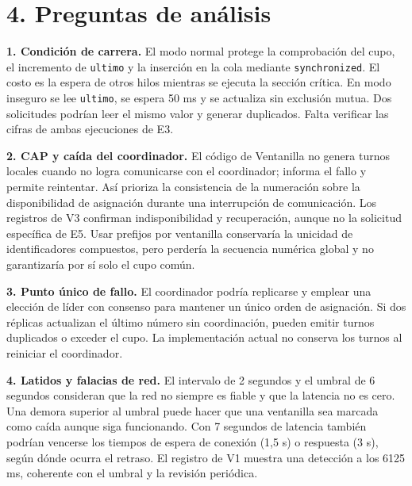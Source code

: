 \documentclass[11pt,a4paper]{article}
\begin{document}
\section*{4. Preguntas de análisis}
\textbf{1. Condición de carrera.} El modo normal protege la comprobación del cupo, el incremento de \texttt{ultimo} y la inserción en la cola mediante \texttt{synchronized}. El costo es la espera de otros hilos mientras se ejecuta la sección crítica. En modo inseguro se lee \texttt{ultimo}, se espera 50 ms y se actualiza sin exclusión mutua. Dos solicitudes podrían leer el mismo valor y generar duplicados. Falta verificar las cifras de ambas ejecuciones de E3.

\textbf{2. CAP y caída del coordinador.} El código de Ventanilla no genera turnos locales cuando no logra comunicarse con el coordinador; informa el fallo y permite reintentar. Así prioriza la consistencia de la numeración sobre la disponibilidad de asignación durante una interrupción de comunicación. Los registros de V3 confirman indisponibilidad y recuperación, aunque no la solicitud específica de E5. Usar prefijos por ventanilla conservaría la unicidad de identificadores compuestos, pero perdería la secuencia numérica global y no garantizaría por sí solo el cupo común.

\textbf{3. Punto único de fallo.} El coordinador podría replicarse y emplear una elección de líder con consenso para mantener un único orden de asignación. Si dos réplicas actualizan el último número sin coordinación, pueden emitir turnos duplicados o exceder el cupo. La implementación actual no conserva los turnos al reiniciar el coordinador.

\textbf{4. Latidos y falacias de red.} El intervalo de 2 segundos y el umbral de 6 segundos consideran que la red no siempre es fiable y que la latencia no es cero. Una demora superior al umbral puede hacer que una ventanilla sea marcada como caída aunque siga funcionando. Con 7 segundos de latencia también podrían vencerse los tiempos de espera de conexión (1,5 s) o respuesta (3 s), según dónde ocurra el retraso. El registro de V1 muestra una detección a los 6125 ms, coherente con el umbral y la revisión periódica.
\end{document}
